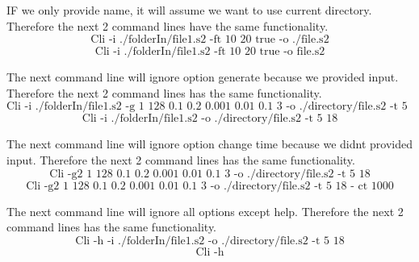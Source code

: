 \documentclass[english]{article}
\begin{document}
IF we only provide name, it will assume we want to use current directory. Therefore the next 2 command lines have the same functionality.
$$\text{Cli -i ./folderIn/file1.s2 -ft 10 20 true -o ./file.s2}$$
$$\text{Cli -i ./folderIn/file1.s2 -ft 10 20 true -o file.s2}$$

The next command line will ignore option generate because we provided input. Therefore the next 2 command lines has the same functionality.
$$\text{Cli -i ./folderIn/file1.s2 -g 1 128 0.1 0.2 0.001 0.01 0.1 3 -o ./directory/file.s2 -t 5 18}$$
$$\text{Cli -i ./folderIn/file1.s2 -o ./directory/file.s2 -t 5 18}$$

The next command line will ignore option change time because we didnt provided input. Therefore the next 2 command lines has the same functionality.
$$\text{Cli -g2 1 128 0.1 0.2 0.001 0.01 0.1 3 -o ./directory/file.s2 -t 5 18}$$
$$\text{Cli -g2 1 128 0.1 0.2 0.001 0.01 0.1 3 -o ./directory/file.s2 -t 5 18 - ct 1000}$$

The next command line will ignore all options except help. Therefore the next 2 command lines has the same functionality.
$$\text{Cli -h -i ./folderIn/file1.s2 -o ./directory/file.s2 -t 5 18}$$
$$\text{Cli -h}$$
\end{document}
